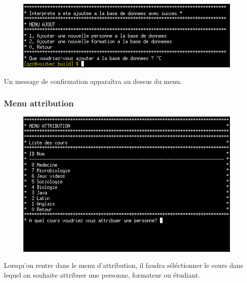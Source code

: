 \documentclass[11pt]{article}
\begin{document}
\newpage
\begin{figure}[ht]
  \centering
  \includegraphics[trim=0 15 10 10, clip, width=\textwidth]{images/12.png}
\end{figure}
Un message de confirmation apparaîtra au dessus du menu.

\subsubsection{Menu attribution}
\begin{figure}[ht]
  \centering
  \includegraphics[trim=0 60 0 0, clip, width=\textwidth]{images/13.png}
\end{figure}
Lorsqu'on rentre dans le menu d'attribution, il faudra séléctionner le cours dans lequel on souhaite attribuer une personne, formateur ou étudiant.
\end{document}
